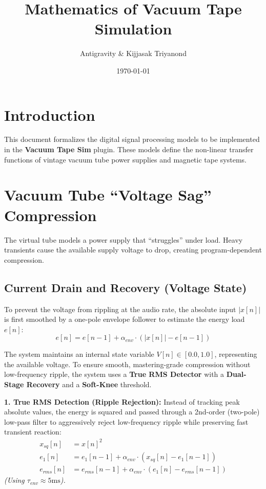 \documentclass[a4paper, 11pt]{article}
\title{Mathematics of Vacuum Tape Simulation}
\author{Antigravity \& Kijjasak Triyanond}
\date{\today}
\begin{document}
\maketitle

\section{Introduction}
This document formalizes the digital signal processing models to be implemented in the \textbf{Vacuum Tape Sim} plugin. These models define the non-linear transfer functions of vintage vacuum tube power supplies and magnetic tape systems.

\section{Vacuum Tube ``Voltage Sag'' Compression}
The virtual tube models a power supply that ``struggles'' under load. Heavy transients cause the available supply voltage to drop, creating program-dependent compression.

\subsection{Current Drain and Recovery (Voltage State)}
To prevent the voltage from rippling at the audio rate, the absolute input $|x[n]|$ is first smoothed by a one-pole envelope follower to estimate the energy load $e[n]$:
\begin{equation}
    e[n] = e[n-1] + \alpha_{env} \cdot (|x[n]| - e[n-1])
\end{equation}

The system maintains an internal state variable $V[n] \in [0.0, 1.0]$, representing the available voltage. To ensure smooth, mastering-grade compression without low-frequency ripple, the system uses a \textbf{True RMS Detector} with a \textbf{Dual-Stage Recovery} and a \textbf{Soft-Knee} threshold.

\textbf{1. True RMS Detection (Ripple Rejection):}
Instead of tracking peak absolute values, the energy is squared and passed through a 2nd-order (two-pole) low-pass filter to aggressively reject low-frequency ripple while preserving fast transient reaction:
\begin{align}
    x_{sq}[n] &= x[n]^2 \\
    e_1[n] &= e_1[n-1] + \alpha_{env} \cdot (x_{sq}[n] - e_1[n-1]) \\
    e_{rms}[n] &= e_{rms}[n-1] + \alpha_{env} \cdot (e_1[n] - e_{rms}[n-1])
\end{align}
\textit{(Using $\tau_{env} \approx 5\text{ms}$).}
\end{document}

